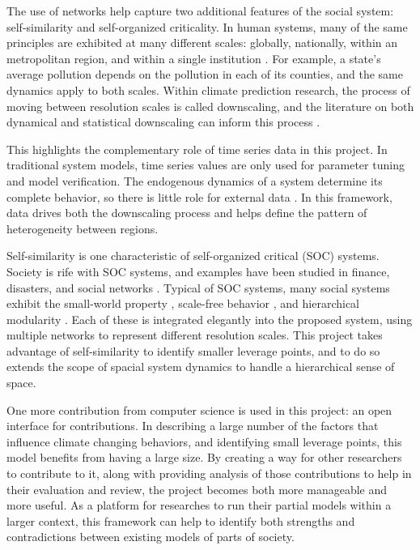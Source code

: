 \documentclass[12pt, oneside]{amsart}
\begin{document}
The use of networks help capture two additional features of the social system: self-similarity and self-organized criticality.  In human systems, many of the same principles are exhibited at many different scales: globally, nationally, within an metropolitan region, and within a single institution \citep{song2005self}.  For example, a state's average pollution depends on the pollution in each of its counties, and the same dynamics apply to both scales.  Within climate prediction research, the process of moving between resolution scales is called downscaling, and the literature on both dynamical and statistical downscaling can inform this process \citep{murphy1999evaluation}.

This highlights the complementary role of time series data in this project.  In traditional system models, time series values are only used for parameter tuning and model verification.  The endogenous dynamics of a system determine its complete behavior, so there is little role for external data \citep{Forrester1991}.  In this framework, data drives both the downscaling process and helps define the pattern of heterogeneity between regions.

Self-similarity is one characteristic of self-organized critical (SOC) systems.  Society is rife with SOC systems, and examples have been studied in finance, disasters, and social networks \citep{turcotte2002self}.  Typical of SOC systems, many social systems exhibit the small-world property \citep{watts1998collective}, scale-free behavior \citep{barabasi1999emergence}, and hierarchical modularity \citep{ravasz2002hierarchical}.  Each of these is integrated elegantly into the proposed system, using multiple networks to represent different resolution scales.  This project takes advantage of self-similarity to identify smaller leverage points, and to do so extends the scope of spacial system dynamics to handle a hierarchical sense of space.

One more contribution from computer science is used in this project: an open interface for contributions.  In describing a large number of the factors that influence climate changing behaviors, and identifying small leverage points, this model benefits from having a large size.  By creating a way for other researchers to contribute to it, along with providing analysis of those contributions to help in their evaluation and review, the project becomes both more manageable and more useful.  As a platform for researches to run their partial models within a larger context, this framework can help to identify both strengths and contradictions between existing models of parts of society.
\end{document}
